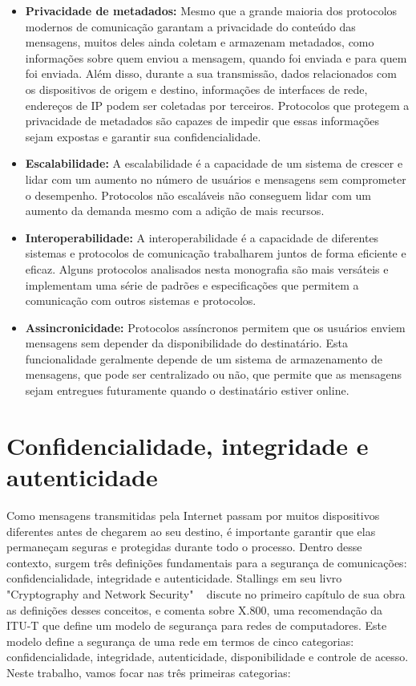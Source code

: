 \begin{itemize}
    \item \textbf{Privacidade de metadados:} Mesmo que a grande maioria dos protocolos modernos de comunicação garantam a privacidade do conteúdo das mensagens, muitos deles ainda coletam e armazenam metadados, como informações sobre quem enviou a mensagem, quando foi enviada e para quem foi enviada. Além disso, durante a sua transmissão, dados relacionados com os dispositivos de origem e destino, informações de interfaces de rede, endereços de IP podem ser coletadas por terceiros. Protocolos que protegem a privacidade de metadados são capazes de impedir que essas informações sejam expostas e garantir sua confidencialidade.
    
    \item \textbf{Escalabilidade:} A escalabilidade é a capacidade de um sistema de crescer e lidar com um aumento no número de usuários e mensagens sem comprometer o desempenho. Protocolos não escaláveis não conseguem lidar com um aumento da demanda mesmo com a adição de mais recursos.
    
    \item \textbf{Interoperabilidade:} A interoperabilidade é a capacidade de diferentes sistemas e protocolos de comunicação trabalharem juntos de forma eficiente e eficaz. Alguns protocolos analisados nesta monografia são mais versáteis e implementam uma série de padrões e especificações que permitem a comunicação com outros sistemas e protocolos.

    \item \textbf{Assincronicidade:} Protocolos assíncronos permitem que os usuários enviem mensagens sem depender da disponibilidade do destinatário. Esta funcionalidade geralmente depende de um sistema de armazenamento de mensagens, que pode ser centralizado ou não, que permite que as mensagens sejam entregues futuramente quando o destinatário estiver online.
\end{itemize}

\section{Confidencialidade, integridade e autenticidade}

Como mensagens transmitidas pela Internet passam por muitos dispositivos diferentes antes de chegarem ao seu destino, é importante garantir que elas permaneçam seguras e protegidas durante todo o processo. Dentro desse contexto, surgem três definições fundamentais para a segurança de comunicações: confidencialidade, integridade e autenticidade. Stallings em seu livro "Cryptography and Network Security" ~\cite{Stallings2017} discute no primeiro capítulo de sua obra as definições desses conceitos, e comenta sobre X.800, uma recomendação da ITU-T que define um modelo de segurança para redes de computadores. Este modelo define a segurança de uma rede em termos de cinco categorias: confidencialidade, integridade, autenticidade, disponibilidade e controle de acesso. Neste trabalho, vamos focar nas três primeiras categorias:

